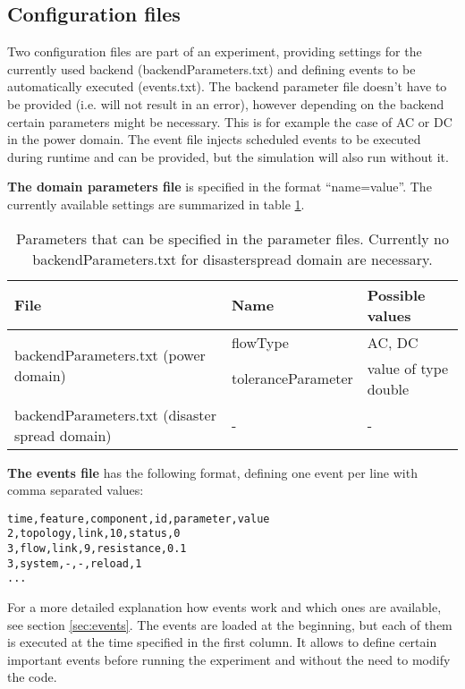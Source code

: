 \documentclass[11pt,fleqn]{book} %
\newcommand{\Backend}[1][]{Backend#1} %
\newcommand{\backend}[1][]{backend#1}
\newcommand{\domain}[1][]{domain#1}
\newcommand{\backendparameters}{domain parameters}
\newcommand{\backendParametersFile}{backendParameters.txt}
\begin{document}
\subsection{Configuration files}\index{\Backend{}}\label{subsec:config_files}
Two configuration files are part of an experiment, providing settings for the currently used \backend{} (\backendParametersFile{}) and defining events to be automatically executed (events.txt). The \backend{} parameter file doesn’t have to be provided (i.e. will not result in an error), however depending on the \backend{} certain parameters might be necessary. This is for example the case of AC or DC in the power \domain{}. The event file injects scheduled events to be executed during runtime and can be provided, but the simulation will also run without it. 

\textbf{The \backendparameters{} file} is specified in the format “name=value”. The currently available settings are summarized in table \ref{table:params}.

\begin{table}[h]
\centering
\begin{tabular}{|l| l| l|}
\hline
\rowcolor{Gray}
File & Name & Possible values\\
\hline
\multirow{2}{*}{\parbox{4cm}{\backendParametersFile{} (power \domain{})} } & flowType & AC, DC \\ 
\cline{2-3} & toleranceParameter & value of type double \\ \hline
\backendParametersFile{} (disaster spread \domain{}) & - & - \\ \hline
\end{tabular}
\label{table:params}
\caption{Parameters that can be specified in the parameter files. Currently no \backendParametersFile{} for disaster\textunderscore spread \domain{} are necessary.}
\end{table}

\textbf{The events file} has the following format, defining one event per line with comma separated values:

\begin{lstlisting}[frame=single] 
time,feature,component,id,parameter,value
2,topology,link,10,status,0
3,flow,link,9,resistance,0.1
3,system,-,-,reload,1
...
\end{lstlisting}

For a more detailed explanation how events work and which ones are available, see  section \ref{sec:events}. The events are loaded at the beginning, but each of them is executed at the time specified in the first column. It allows to define certain important events before running the experiment and without the need to modify the code. 
\end{document}
